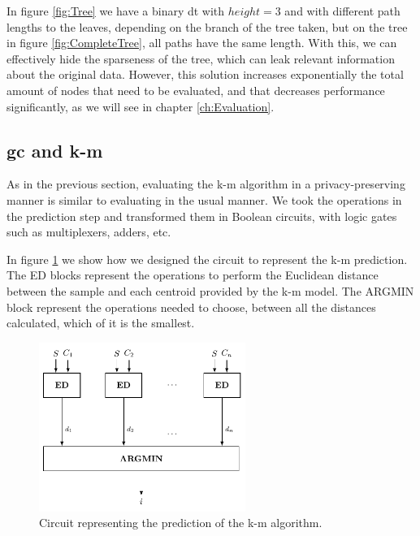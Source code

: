 In figure \ref{fig:Tree} we have a binary \ac{dt} with $height=3$ and with different path lengths to the leaves, depending on the branch of the tree taken, but on the tree in figure \ref{fig:CompleteTree}, all paths have the same length. With this, we can effectively hide the sparseness of the tree, which can leak relevant information about the original data. However, this solution increases exponentially the total amount of nodes that need to be evaluated, and that decreases performance significantly, as we will see in chapter \ref{ch:Evaluation}.
                


\subsection{\acl{gc} and \acl{k-m}}
\label{ssec:GCandk-M}



As in the previous section, evaluating the \ac{k-m} algorithm in a privacy-preserving manner is similar to evaluating in the usual manner. We took the operations in the prediction step and transformed them in Boolean circuits, with logic gates such as multiplexers, adders, etc.

In figure \ref{fig:kmeans} we show how we designed the circuit to represent the \ac{k-m} prediction. The ED blocks represent the operations to perform the Euclidean distance between the sample and each centroid provided by the \ac{k-m} model. The ARGMIN block represent the operations needed to choose, between all the distances calculated, which of it is the smallest.


\begin{figure}[H]
  \centering
  \includegraphics[width=0.60\textwidth]{images/k-means.pdf}
  \caption{Circuit representing the prediction of the \ac{k-m} algorithm.}
  \label{fig:kmeans}
\end{figure}


